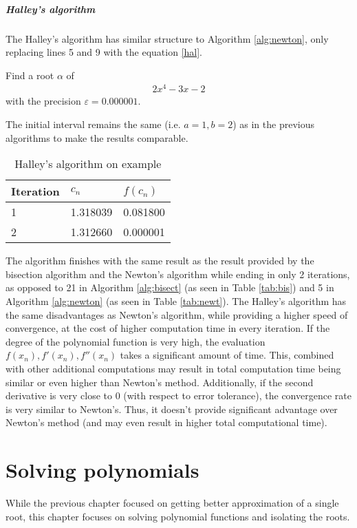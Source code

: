 \documentclass[
  digital, %
  table,   %
  nolof,     %
  nolot,     %
	draft, %
]{fithesis3}
\begin{document}
\paragraph{Halley's algorithm}
The Halley's algorithm has similar structure to Algorithm \ref{alg:newton}, only replacing lines 5 and 9 with the equation \ref{hal}.
\begin{example}
Find a root $\alpha$ of 
\begin{align}
      2x^{4} - 3x - 2
\end{align}
with the precision $\varepsilon = 0.000001$.
\end{example}
The initial interval remains the same (i.e. $a=1, b=2$) as in the previous algorithms to make the results comparable.
\FloatBarrier
\begin{table}[H]
  \begin{tabularx}{\textwidth}{lll}
    \toprule
    Iteration & $c_{n}$ & $f(c_{n})$\\
    \midrule
				1 & 1.318039 & 0.081800 \\
				2 & 1.312660 & 0.000001 \\
    \bottomrule
  \end{tabularx}
  \caption{Halley's algorithm on example}
  \label{tab:hall}
\end{table}
The algorithm finishes with the same result as the result provided by the bisection algorithm and the Newton's algorithm while ending in only 2 iterations, as opposed to 21 in Algorithm \ref{alg:bisect} (as seen in Table \ref{tab:bis}) and 5 in Algorithm \ref{alg:newton} (as seen in Table \ref{tab:newt}).
The Halley's algorithm has the same disadvantages as Newton's algorithm, while providing a higher speed of convergence, at the cost of higher computation time in every iteration. If the degree of the polynomial function is very high, the evaluation $f(x_{n}), f'(x_{n}), f''(x_{n})$ takes a significant amount of time. This, combined with other additional computations may result in total computation time being similar or even higher than Newton's method. Additionally, if the second derivative is very close to 0 (with respect to error tolerance), the convergence rate is very similar to Newton's. Thus, it doesn't provide significant advantage over Newton's method (and may even result in higher total computational time).

\chapter{Solving polynomials}
While the previous chapter focused on getting better approximation of a single root, this chapter focuses on solving polynomial functions and isolating the roots.
\end{document}
